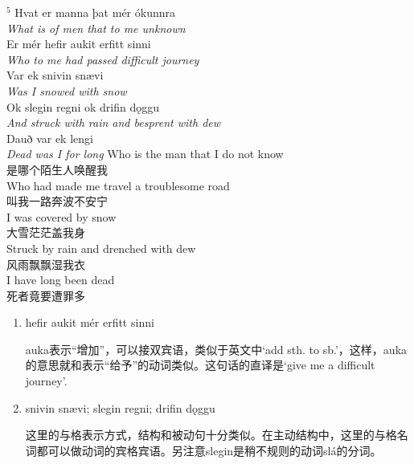 \begin{paracol}{2}
    \noindent
    $^5$ Hvat er manna þat mér ókunnra\\
    \textit{What is of men that to me unknown}\\
    Er mér hefir aukit erfitt sinni\\
    \textit{Who to me had passed difficult journey}\\
    Var ek snivin snævi \\
    \textit{Was I snowed with snow}\\
    Ok slegin regni ok drifin dǫggu \\
    \textit{And struck with rain and besprent with dew}\\
    Dauð var ek lengi\\
    \textit{Dead was I for long}
    \switchcolumn
    \noindent
    Who is the man that I do not know\\
    是哪个陌生人唤醒我\\
    Who had made me travel a troublesome road\\
    叫我一路奔波不安宁\\
    I was covered by snow\\
    大雪茫茫盖我身\\
    Struck by rain and drenched with dew\\
    风雨飘飘湿我衣\\
    I have long been dead\\
    死者竟要遭罪多\\
\end{paracol}
\begin{grammar*}{}
    \begin{enumerate}[leftmargin=*]
        \item hefir aukit mér erfitt sinni

              auka表示“增加”，可以接双宾语，类似于英文中`add sth. to sb.'，这样，auka的意思就和表示“给予”的动词类似。这句话的直译是`give me a difficult journey'.

        \item snivin snævi; slegin regni; drifin dǫggu

              这里的与格表示方式，结构和被动句十分类似。在主动结构中，这里的与格名词都可以做动词的宾格宾语。另注意slegin是稍不规则的动词slá的分词。
    \end{enumerate}
\end{grammar*}

